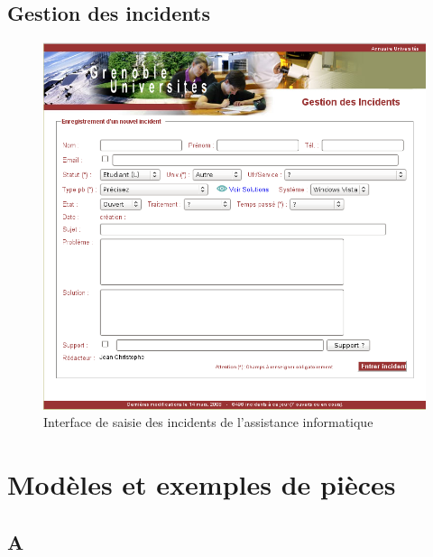 \subsection{Gestion des incidents}
\label{gestion_incidents}
\begin{figure}[!h]
	\centering
	\includegraphics[width=12cm]{annexes/images/gestion_des_incidents.png}
	\caption{Interface de saisie des incidents de l'assistance informatique}
\end{figure}
\clearpage
\section{Modèles et exemples de pièces}
\subsection{A}

